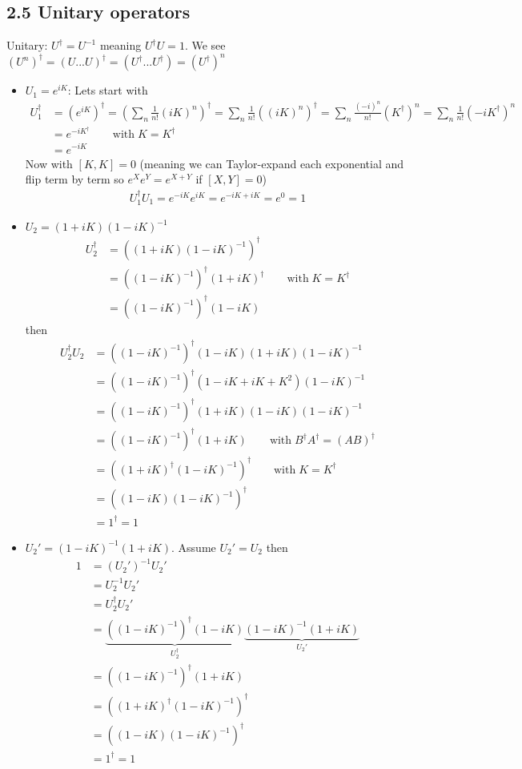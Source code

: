 \documentclass[../main.tex]{subfiles}
\begin{document}
\subsection{2.5 Unitary operators}
Unitary: $U^\dagger=U^{-1}$ meaning $U^\dagger U=1$. We see $(U^n)^\dagger=(U...U)^\dagger=(U^\dagger ...U^\dagger)=(U^\dagger)^n$
\begin{itemize}
\item $U_1=e^{iK}$: Lets start with
\begin{align}
U_1^\dagger
&=\left(e^{iK}\right)^\dagger
=\left(\sum_n\frac{1}{n!}(iK)^n\right)^\dagger
=\sum_n\frac{1}{n!}\left((iK)^n\right)^\dagger
=\sum_n\frac{(-i)^n}{n!}(K^\dagger)^n
=\sum_n\frac{1}{n!}(-iK^\dagger)^n\\
&=e^{-iK^\dagger}\qquad \text{with}\;K=K^\dagger\\
&=e^{-iK}
\end{align}
Now with $[K,K]=0$ (meaning we can Taylor-expand each exponential and flip term by term so $e^Xe^Y=e^{X+Y}$ if $[X,Y]=0$)
\begin{align}
U_1^\dagger U_1=e^{-iK}e^{iK}=e^{-iK+iK}=e^0=1
\end{align}

\item $U_2=(1+iK)(1-iK)^{-1}$
\begin{align}
U_2^\dagger&=\left((1+iK)(1-iK)^{-1}\right)^\dagger\\
&=\left((1-iK)^{-1}\right)^\dagger(1+iK)^\dagger\qquad\text{with}\;K=K^\dagger\\
&=\left((1-iK)^{-1}\right)^\dagger(1-iK)
\end{align}
then
\begin{align}
U_2^\dagger U_2
&=\left((1-iK)^{-1}\right)^\dagger(1-iK)(1+iK)(1-iK)^{-1}\\
&=\left((1-iK)^{-1}\right)^\dagger(1-iK+iK+K^2)(1-iK)^{-1}\\
&=\left((1-iK)^{-1}\right)^\dagger(1+iK)(1-iK)(1-iK)^{-1}\\
&=\left((1-iK)^{-1}\right)^\dagger(1+iK)\qquad\text{with}\;B^\dagger A^\dagger=(AB)^\dagger\\
&=\left((1+iK)^\dagger(1-iK)^{-1} \right)^\dagger\qquad\text{with}\;K=K^\dagger\\
&=\left((1-iK)(1-iK)^{-1} \right)^\dagger\\
&=1^\dagger=1
\end{align}

\item $U_2'=(1-iK)^{-1}(1+iK)$. Assume $U_2'=U_2$ then
\begin{align}
1&=(U_2')^{-1}U_2'\\
&=U_2^{-1} U_2'\\
&=U_2^\dagger U_2'\\
&=\underbrace{\left((1-iK)^{-1}\right)^\dagger(1-iK)}_{U_2^\dagger}\underbrace{(1-iK)^{-1}(1+iK)}_{U_2'}\\
&=\left((1-iK)^{-1}\right)^\dagger(1+iK)\\
&=\left((1+iK)^\dagger(1-iK)^{-1}\right)^\dagger\\
&=\left((1-iK)(1-iK)^{-1}\right)^\dagger\\
&=1^\dagger=1
\end{align}
\end{itemize}
\end{document}
